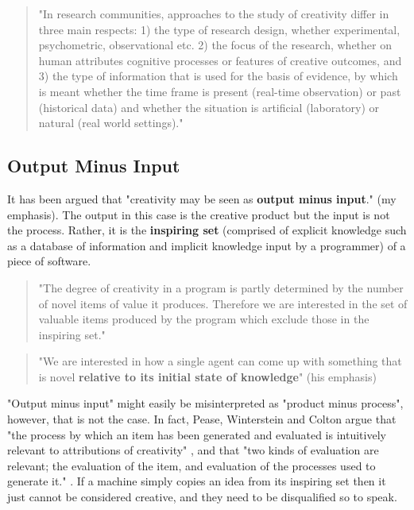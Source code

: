 \begin{quote}
  "In research communities, approaches to the study of creativity differ in three main respects: 1) the type of research design, whether experimental, psychometric, observational etc. 2) the focus of the research, whether on human attributes cognitive processes or features of creative outcomes, and 3) the type of information that is used for the basis of evidence, by which is meant whether the time frame is present (real-time observation) or past (historical data) and whether the situation is artificial (laboratory) or natural (real world settings)." \citep[p.3]{Candy2012}
\end{quote}

\subsection{Output Minus Input}

It has been argued that "creativity may be seen as \textbf{output minus input}." \citep[p.2]{Pease2001}(my emphasis). The output in this case is the creative product but the input is not the process. Rather, it is the \textbf{inspiring set} (comprised of explicit knowledge such as a database of information and implicit knowledge input by a programmer) of a piece of software.

\begin{quote}
  "The degree of creativity in a program is partly determined by the number of novel items of value it produces. Therefore we are interested in the set of valuable items produced by the program which exclude those in the inspiring set." \citep[p.3]{Colton2001}
\end{quote}

\begin{quote}
  "We are interested in how a single agent can come up with something that is novel \textbf{relative to its initial state of knowledge}" \citep[p.72]{Ritchie2007}(his emphasis)
\end{quote}

"Output minus input" might easily be misinterpreted as "product minus process", however, that is not the case. In fact, Pease, Winterstein and Colton argue that "the process by which an item has been generated and evaluated is intuitively relevant to attributions of creativity" \citep[p.6]{Pease2001}, and that "two kinds of evaluation are relevant; the evaluation of the item, and evaluation of the processes used to generate it." \citep[p.7]{Pease2001}. If a machine simply copies an idea from its inspiring set then it just cannot be considered creative, and they need to be disqualified so to speak.

